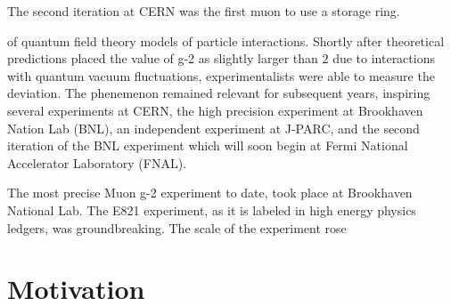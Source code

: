 The second iteration at CERN was the first muon \gmtwo to use a storage ring.




 of quantum field theory models of particle interactions.  Shortly after theoretical predictions placed the value of g-2 as slightly larger than $2$ due to interactions with quantum vacuum fluctuations, experimentalists were able to measure the deviation.  The phenemenon remained relevant for subsequent years, inspiring several experiments at CERN, the high precision experiment at Brookhaven Nation Lab (BNL), an independent experiment at J-PARC, and the second iteration of the BNL experiment which will soon begin at Fermi National Accelerator Laboratory (FNAL).

The most precise Muon g-2 experiment to date, took place at Brookhaven National Lab. The E821 experiment, as it is labeled in high energy physics ledgers, was groundbreaking.  The scale of the experiment rose 

\section{Motivation}



